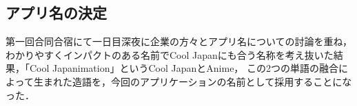 \subsection{アプリ名の決定}
\par
第一回合同合宿にて一日目深夜に企業の方々とアプリ名についての討論を重ね，
わかりやすくインパクトのある名前でCool Japanにも合う名称を考え抜いた結果，「Cool Japanimation」というCool JapanとAnime，
この2つの単語の融合によって生まれた造語を，今回のアプリケーションの名前として採用することになった．
